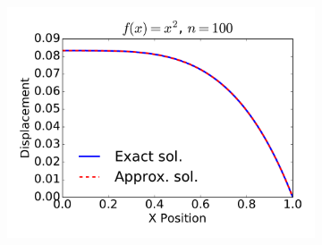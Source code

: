 \documentclass{article}
\begin{document}
\begin{figure}
\begin{subfigure}[b]{0.33\textwidth}
                \includegraphics[width=\linewidth]{displacement_func2_Nell100}
                \label{fig:tiger}
        \end{subfigure}%
        

\end{figure}
\end{document}

